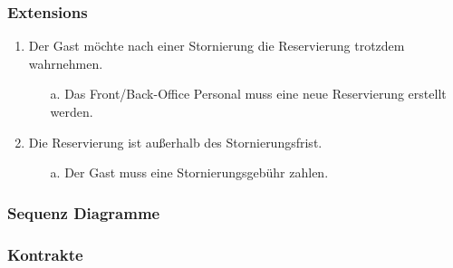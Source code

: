 \documentclass[./detailed_overview_usecases.tex]{subfiles}
\begin{document}
    \subsubsection*{Extensions}
    \begin{enumerate}
        \item Der Gast möchte nach einer Stornierung die Reservierung trotzdem wahrnehmen.
        \begin{itemize}
            \item[a.] Das Front/Back-Office Personal muss eine neue Reservierung erstellt werden.
        \end{itemize}
        \item Die Reservierung ist außerhalb des Stornierungsfrist.
        \begin{itemize}
            \item[a.] Der Gast muss eine Stornierungsgebühr zahlen.
        \end{itemize}
    \end{enumerate}

    \subsubsection{Sequenz Diagramme}
    \subsubsection{Kontrakte}
\end{document}

